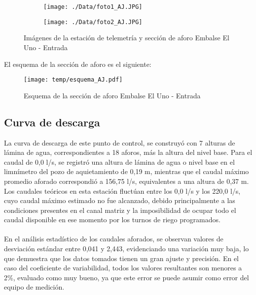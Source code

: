 \documentclass[]{article}
\begin{document}
\begin{figure}[H]
  \centering
\begin{subfigure}{.49\textwidth}
  \texttt{[image: ./Data/foto1\_AJ.JPG]}
\end{subfigure}
\hfill
\begin{subfigure}{.49\textwidth}
  \texttt{[image: ./Data/foto2\_AJ.JPG]}
\end{subfigure}
\caption{Imágenes de la estación de telemetría y sección de aforo Embalse El Uno - Entrada}
\label{fig:fotos_10}
\end{figure}

El esquema de la sección de aforo es el siguiente:

\begin{figure}[H]
  \centering
  \texttt{[image: temp/esquema\_AJ.pdf]}
\caption{Esquema de la sección de aforo Embalse El Uno - Entrada}
\label{fig:Esquema_AJ}
\end{figure}

\subsection{Curva de descarga}\label{curva-de-descarga-9}

La curva de descarga de este punto de control, se construyó con 7 alturas de lámina de agua, correspondientes a 18 aforos, más la altura del nivel base. Para el caudal de 0,0 l/s, se registró una altura de lámina de agua o nivel base en el limnímetro del pozo de aquietamiento de 0,19 m, mientras que el caudal máximo promedio aforado correspondió a 156,75 l/s, equivalentes a una altura de 0,37 m. Los caudales teóricos en esta estación fluctúan entre los 0,0 l/s y los 220,0 l/s, cuyo caudal máximo estimado no fue alcanzado, debido principalmente a las condiciones presentes en el canal matriz y la imposibilidad de ocupar todo el caudal disponible en ese momento por los turnos de riego programados.\\
\\
En el análisis estadístico de los caudales aforados, se observan valores de desviación estándar entre 0,041 y 2,443, evidenciando una variación muy baja, lo que demuestra que los datos tomados tienen un gran ajuste y precisión. En el caso del coeficiente de variabilidad, todos los valores resultantes son menores a 2\%, evaluado como muy bueno, ya que este error se puede asumir como error del equipo de medición.
\end{document}
